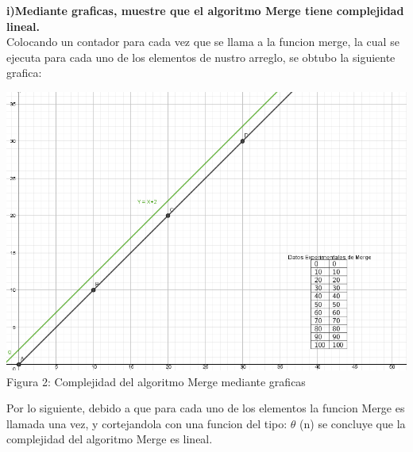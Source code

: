 \documentclass[spanish]{article}
\begin{document}
	{\large{\bf i)Mediante graficas, muestre que el algoritmo Merge tiene complejidad lineal.}}\\
	Colocando un contador para cada vez que se llama a la funcion merge, la cual se ejecuta para cada uno de los elementos de nustro arreglo, se obtubo la siguiente grafica:\\
	\begin{center}
	\includegraphics[scale=.5]{./imagenes/merge.png}\\
		Figura 2: Complejidad del algoritmo Merge mediante graficas
	\end{center}
	Por lo siguiente, debido a que para cada uno de los elementos la funcion Merge es llamada una vez, y cortejandola con una funcion del tipo:  $\theta$ (n) se concluye que la complejidad del algoritmo Merge es lineal.\\
\end{document}
